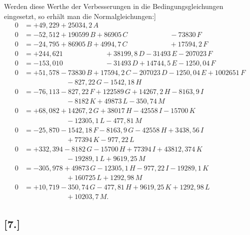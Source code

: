 \documentclass[12pt,a4paper]{article}
\theoremstyle{plain}
\theoremstyle{definition}
\theoremstyle{remark}
\begin{document}
Werden diese Werthe der Verbesserungen in die Bedingungsgleichungen eingesetzt, so erh\"alt man die Normalgleichungen:]
\begin{align*}
0 &= +49{,}229 + 25034{,}2\,A\\
0 &= -52{,}512 + 190599\,B + 86905\,C \quad\quad\quad\quad\quad\quad - 73830\,F\\
0 &= -24{,}795 + 86905\,B + 4994{,}7\,C \quad\quad\quad\quad\quad\quad + 17594{,}2\,F\\
0 &= +244{,}621 \quad\quad\quad\quad\quad\quad + 38199{,}8\,D - 31493\,E - 207023\,F\\
0 &= -153{,}010 \quad\quad\quad\quad\quad\quad - 31493\,D + 14744{,}5\,E - 1250{,}04\,F\\
0 &= +51{,}578 - 73830\,B + 17594{,}2\,C - 207023\,D - 1250{,}04\,E + 1002651\,F\\
  &\quad\quad\quad\quad\quad\quad - 827{,}22\,G - 1542{,}18\,H\\
0 &= -76{,}113 - 827{,}22\,F + 122589\,G + 14267{,}2\,H - 8163{,}9\,I\\
  &\quad\quad\quad\quad\quad\quad - 8182\,K + 49873\,L - 350{,}74\,M\\
0 &= +68{,}082 + 14267{,}2\,G + 38017\,H - 42558\,I - 15700\,K\\
  &\quad\quad\quad\quad\quad\quad - 12305{,}1\,L - 477{,}81\,M\\
0 &= -25{,}870 - 1542{,}18\,F - 8163{,}9\,G - 42558\,H + 3438{,}56\,I\\
  &\quad\quad\quad\quad\quad\quad + 77394\,K - 977{,}22\,L\\
0 &= +332{,}394 - 8182\,G - 15700\,H + 77394\,I + 43812{,}374\,K\\
  &\quad\quad\quad\quad\quad\quad - 19289{,}1\,L + 9619{,}25\,M\\
0 &= -305{,}978 + 49873\,G - 12305{,}1\,H - 977{,}22\,I - 19289{,}1\,K\\
  &\quad\quad\quad\quad\quad\quad + 160725\,L + 1292{,}98\,M\\
0 &= +10{,}719 - 350{,}74\,G - 477{,}81\,H + 9619{,}25\,K + 1292{,}98\,L\\
  &\quad\quad\quad\quad\quad\quad + 10203{,}7\,M.
\end{align*}

\newpage
\subsection*{[7.]}
\label{subsec:netz7}
\end{document}
